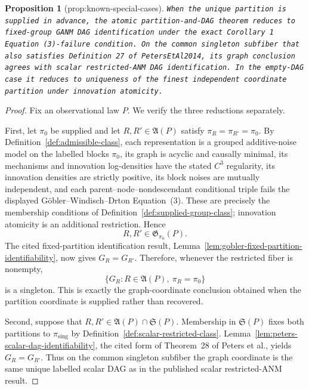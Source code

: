 \documentclass{article}
\newtheorem{proposition}{Proposition}
\begin{document}
\begin{proposition}[prop:known-special-cases]\label{prop:known-special-cases}
\texttt{When the unique partition is supplied in advance,\allowbreak{} the atomic partition-\allowbreak{}and-\allowbreak{}DAG theorem reduces to fixed-\allowbreak{}group GANM DAG identification under the exact Corollary 1 Equation (3)-\allowbreak{}failure condition. On the common singleton subfiber that also satisfies Definition 27 of PetersEtAl2014,\allowbreak{} its graph conclusion agrees with scalar restricted-\allowbreak{}ANM DAG identification. In the empty-\allowbreak{}DAG case it reduces to uniqueness of the finest independent coordinate partition under innovation atomicity.}
\end{proposition}
\begin{proof}
Fix an observational law \(P\).  We verify the three reductions separately.

First, let \(\pi_0\) be supplied and let \(R,R'\in\mathfrak A(P)\) satisfy
\(\pi_R=\pi_{R'}=\pi_0\).  By Definition~\ref{def:admissible-class}, each
representation is a grouped additive-noise model on the labelled blocks
\(\pi_0\), its graph is acyclic and causally minimal, its mechanisms and
innovation log-densities have the stated \(C^3\) regularity, its innovation
densities are strictly positive, its block noises are mutually independent,
and each parent--node--nondescendant conditional triple fails the displayed
Göbler--Windisch--Drton Equation~(3).  These are precisely the membership
conditions of Definition~\ref{def:supplied-group-class}; innovation atomicity
is an additional restriction.  Hence
\[
 R,R'\in\mathfrak G_{\pi_0}(P).
\]
The cited fixed-partition identification result,
Lemma~\ref{lem:gobler-fixed-partition-identifiability}, now gives
\(G_R=G_{R'}\).  Therefore, whenever the restricted fiber is nonempty,
\[
 \bigl\{G_R:R\in\mathfrak A(P),\ \pi_R=\pi_0\bigr\}
\]
is a singleton.  This is exactly the graph-coordinate conclusion obtained
when the partition coordinate is supplied rather than recovered.

Second, suppose that \(R,R'\in\mathfrak A(P)\cap\mathfrak S(P)\).  Membership
in \(\mathfrak S(P)\) fixes both partitions to
\(\pi_{\mathrm{sing}}\) by Definition~\ref{def:scalar-restricted-class}.
Lemma~\ref{lem:peters-scalar-dag-identifiability}, the cited form of
Theorem~28 of Peters et al., yields \(G_R=G_{R'}\).  Thus on the common
singleton subfiber the graph coordinate is the same unique labelled scalar
DAG as in the published scalar restricted-ANM result.


\end{proof}
\end{document}

